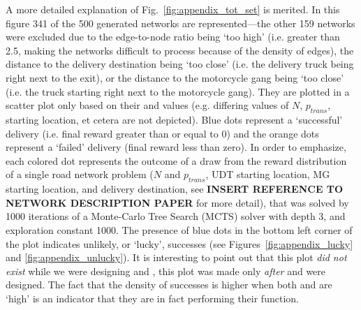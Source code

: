 A more detailed explanation of Fig.~\ref{fig:appendix_tot_set} is merited. In this figure 341 of the 500 generated networks are represented---the other 159 networks were excluded due to the edge-to-node ratio being `too high' (i.e. greater than 2.5, making the networks difficult to process because of the density of edges), the distance to the delivery destination being `too close' (i.e. the delivery truck being right next to the exit), or the distance to the motorcycle gang being `too  close' (i.e. the truck starting right next to the motorcycle gang). They are plotted in a scatter plot only based on their \xQ{} and \xO{} values (e.g. differing values of $N$, $p_{trans}$, starting location, et cetera are not depicted). Blue dots represent a `successful' delivery (i.e. final reward greater than or equal to 0) and the orange dots represent a `failed' delivery (final reward less than zero). In order to emphasize, each colored dot represents the outcome of a draw from the \pri{} reward distribution of a single road network problem ($N$ and $p_{trans}$, UDT starting location, MG starting location, and delivery destination, see \textbf{INSERT REFERENCE TO NETWORK DESCRIPTION PAPER} for more detail), that was solved by 1000 iterations of a Monte-Carlo Tree Search (MCTS) solver with depth 3, and exploration constant 1000. The presence of blue dots in the bottom left corner of the plot indicates unlikely, or `lucky', successes (see Figures~\ref{fig:appendix_lucky} and \ref{fig:appendix_unlucky}). It is interesting to point out that this plot \emph{did not exist} while we were designing \xQ{} and \xO{}, this plot was made only \emph{after} \xQ{} and \xO{} were designed. The fact that the density of successes is higher when both \xQ{} and \xO{} are `high' is an indicator that they are in fact performing their function.

